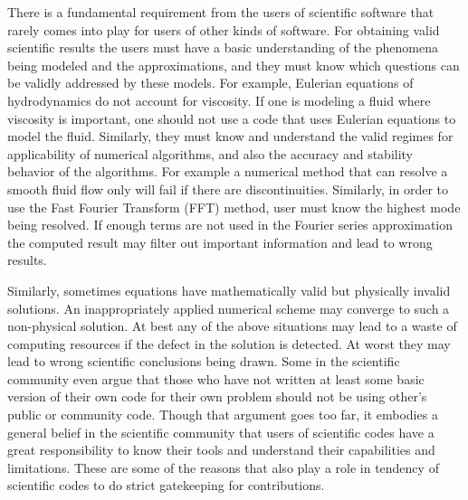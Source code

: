 \label{sec:using}
There is a fundamental requirement from the users of scientific
software that rarely comes into play for users of other kinds of
software. For obtaining valid scientific results the users must 
have a basic understanding of the phenomena being modeled and the
approximations, and they must know which questions can be validly 
addressed by these models. For example, Eulerian equations of
hydrodynamics do not account for viscosity. If one is modeling a fluid
where viscosity is important, one should not use a code that uses
Eulerian equations to model the fluid. Similarly, they must know and
understand the valid regimes for applicability of numerical
algorithms, and also the accuracy and stability behavior of the
algorithms. For example a numerical method that can resolve a smooth
fluid flow only will fail if there are discontinuities. Similarly, in
order to use the Fast Fourier Transform (FFT) method, user must know
the highest mode being resolved. If enough terms are not used in the Fourier series
approximation the computed result may filter out important information
and lead to wrong results.

Similarly, sometimes equations have mathematically valid but
physically invalid solutions. An inappropriately applied numerical scheme may
converge to such a non-physical solution. At best any of the above
situations may lead to a waste of computing resources if the defect in
the solution is detected. At worst they may lead to wrong scientific
conclusions being drawn. Some in the scientific community even argue
that those who have not written at least some basic version of their
own code for their own problem should not be using other's public or
community code. Though that argument goes too far, it embodies a
general belief in the scientific community that users of scientific
codes have a great responsibility to know their tools and understand
their capabilities and limitations. 
These are some of the reasons that also play a role in tendency of scientific
codes to do strict gatekeeping for contributions.

